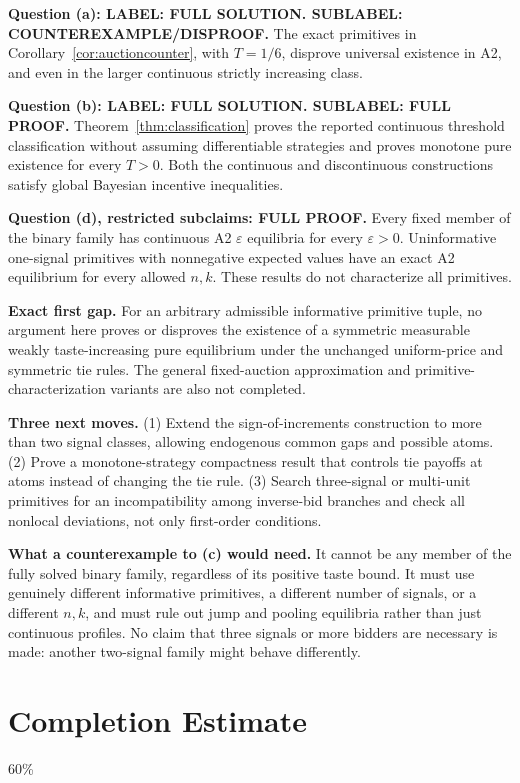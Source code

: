\documentclass[11pt,a4paper]{article}
\theoremstyle{remark}\newtheorem{remark}[theorem]{Remark}
\begin{document}
\textbf{Question (a): LABEL: FULL SOLUTION. SUBLABEL: COUNTEREXAMPLE/DISPROOF.}
The exact primitives in Corollary~\ref{cor:auctioncounter}, with $T=1/6$, disprove universal existence in A2, and even in the larger continuous strictly increasing class.

\textbf{Question (b): LABEL: FULL SOLUTION. SUBLABEL: FULL PROOF.}
Theorem~\ref{thm:classification} proves the reported continuous threshold classification without assuming differentiable strategies and proves monotone pure existence for every $T>0$. Both the continuous and discontinuous constructions satisfy global Bayesian incentive inequalities.

\textbf{Question (d), restricted subclaims: FULL PROOF.}
Every fixed member of the binary family has continuous A2 $\varepsilon$ equilibria for every $\varepsilon>0$. Uninformative one-signal primitives with nonnegative expected values have an exact A2 equilibrium for every allowed $n,k$. These results do not characterize all primitives.

\textbf{Exact first gap.} For an arbitrary admissible informative primitive tuple, no argument here proves or disproves the existence of a symmetric measurable weakly taste-increasing pure equilibrium under the unchanged uniform-price and symmetric tie rules. The general fixed-auction approximation and primitive-characterization variants are also not completed.

\textbf{Three next moves.} (1) Extend the sign-of-increments construction to more than two signal classes, allowing endogenous common gaps and possible atoms. (2) Prove a monotone-strategy compactness result that controls tie payoffs at atoms instead of changing the tie rule. (3) Search three-signal or multi-unit primitives for an incompatibility among inverse-bid branches and check all nonlocal deviations, not only first-order conditions.

\textbf{What a counterexample to (c) would need.} It cannot be any member of the fully solved binary family, regardless of its positive taste bound. It must use genuinely different informative primitives, a different number of signals, or a different $n,k$, and must rule out jump and pooling equilibria rather than just continuous profiles. No claim that three signals or more bidders are necessary is made: another two-signal family might behave differently.

\section{Completion Estimate}
60\%
\end{document}
